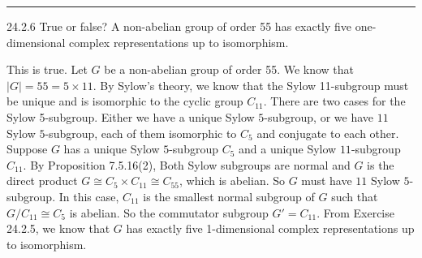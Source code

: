 \documentclass[a4paper, 12pt]{article}
\begin{document}
\noindent\rule{7in}{2.8pt}
\begin{problem}{24.2.6}
True or false? A non-abelian group of order 55 has exactly five one-dimensional complex representations up to isomorphism.
\end{problem}
\begin{solution}
This is true. Let \(G\) be a non-abelian group of order 55. We know that \(|G|=55=5\times 11\). By Sylow's theory, we know that the Sylow 11-subgroup must be unique and is isomorphic to the cyclic group \(C_{11}\). There are two cases for the Sylow 5-subgroup. Either we have 
a unique Sylow \(5\)-subgroup, or we have \(11\) Sylow \(5\)-subgroup, each of them isomorphic to \(C_5\) and conjugate to each other. Suppose \(G\) has a unique Sylow \(5\)-subgroup \(C_5\) and a unique Sylow \(11\)-subgroup \(C_{11}\). By Proposition 7.5.16(2), Both Sylow subgroups are normal and \(G\) is the 
direct product \(G\cong C_5\times C_{11}\cong C_{55}\), which is abelian. So \(G\) must have \(11\) Sylow \(5\)-subgroup. In this case, \(C_{11}\) is the smallest normal subgroup of \(G\) such that \(G/C_{11}\cong C_5\) is abelian. So the commutator subgroup \(G'=C_{11}\). From Exercise 24.2.5, we know that \(G\) has exactly five 1-dimensional complex representations 
up to isomorphism.
\end{solution}
\end{document}
